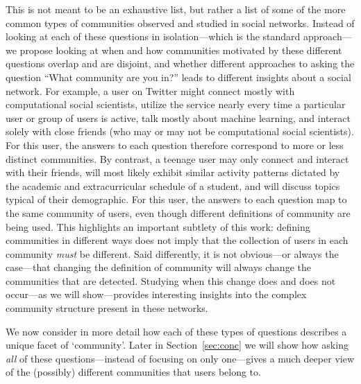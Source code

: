 \documentclass[10pt,letterpaper]{article}
\begin{document}
This is not meant to be an exhaustive list, but rather a list of some of the more common types of communities observed and studied in social networks. Instead of looking at each of these questions in isolation---which is the standard approach---we propose looking at when and how communities motivated by these different questions overlap and are disjoint, and whether different approaches to asking the question ``What community are you in?'' leads to different insights about a social network. For example, a user on Twitter might connect mostly with computational social scientists, utilize the service nearly every time a particular user or group of users is active, talk mostly about machine learning, and interact solely with close friends (who may or may not be computational social scientists). 
For this user, the answers to each question therefore correspond to more or less distinct communities. By contrast, a teenage user may only connect and interact with their friends, will most likely exhibit similar activity patterns dictated by the academic and extracurricular schedule of a student, and will discuss topics typical of their demographic. For this user, the answers to each question map to the same community of users, even though different definitions of community are being used. This highlights an important subtlety of this work: defining communities in different ways does not imply that the collection of users in each community \emph{must} be different. Said differently, it is not obvious---or always the case---that changing the definition of community will always change the communities that are detected. Studying when this change does and does not occur---as we will show---provides interesting insights into the complex community structure present in these networks.

We now consider in more detail how each of these types of questions describes a unique facet of `community'. Later in Section~\ref{sec:conc} we will show how asking \emph{all} of these questions---instead of focusing on only one---gives a much deeper view of the (possibly) different communities that users belong to. 
\end{document}
